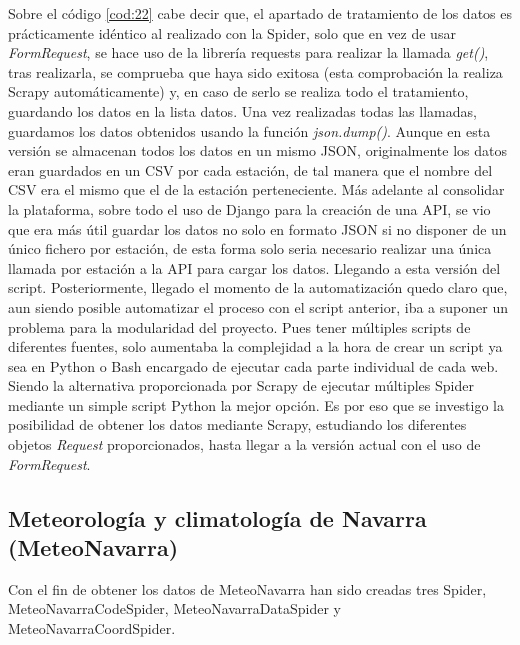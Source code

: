 Sobre el código \ref{cod:22} cabe decir que, el apartado de tratamiento de los datos es prácticamente idéntico al realizado con la Spider, solo que en vez de usar \textit{FormRequest}, se hace uso de la librería requests para realizar la llamada \textit{get()}, tras realizarla, se comprueba que haya sido exitosa (esta comprobación la realiza Scrapy automáticamente) y, en caso de serlo se realiza todo el tratamiento, guardando los datos en la lista datos. Una vez realizadas todas las llamadas, guardamos los datos obtenidos usando la función \textit{json.dump()}.\newline
\newline
Aunque en esta versión se almacenan todos los datos en un mismo JSON, originalmente los datos eran guardados en un CSV por cada estación, de tal manera que el nombre del CSV era el mismo que el de la estación perteneciente. Más adelante al consolidar la plataforma, sobre todo el uso de Django para la creación de una API, se vio que era más útil guardar los datos no solo en formato JSON si no disponer de un único fichero por estación, de esta forma solo seria necesario realizar una única llamada por estación a la API para cargar los datos. Llegando a esta versión del script.\newline
\newline
Posteriormente, llegado el momento de la automatización quedo claro que, aun siendo posible automatizar el proceso con el script anterior, iba a suponer un problema para la modularidad del proyecto. Pues tener múltiples scripts de diferentes fuentes, solo aumentaba la complejidad a la hora de crear un script ya sea en Python o Bash encargado de ejecutar cada parte individual de cada web. Siendo la alternativa proporcionada por Scrapy de ejecutar múltiples Spider mediante un simple script Python la mejor opción.\newline
\newline
Es por eso que se investigo la posibilidad de obtener los datos mediante Scrapy, estudiando los diferentes objetos \textit{Request} proporcionados, hasta llegar a la versión actual con el uso de \textit{FormRequest}.

\subsection{Meteorología y climatología de Navarra (MeteoNavarra)}
Con el fin de obtener los datos de MeteoNavarra han sido creadas tres Spider, MeteoNavarraCodeSpider, MeteoNavarraDataSpider y MeteoNavarraCoordSpider.

